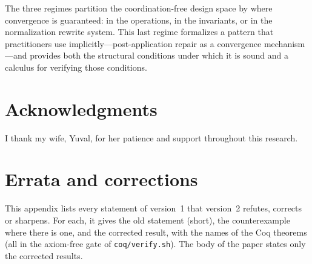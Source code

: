 \documentclass[11pt,a4paper]{article}
\theoremstyle{plain}
\theoremstyle{definition}
\theoremstyle{remark}
\begin{document}
The three regimes partition the coordination-free design space by where
convergence is guaranteed: in the operations, in the invariants, or in the
normalization rewrite system.  This last regime formalizes a pattern that
practitioners use implicitly---post-application repair as a convergence
mechanism---and provides both the structural conditions under which it is
sound and a calculus for verifying those conditions.

\section*{Acknowledgments}

I thank my wife, Yuval, for her patience and support throughout this research.

\appendix
\section{Errata and corrections}
\label{app:errata}

This appendix lists every statement of version~1 that version~2 refutes,
corrects or sharpens.  For each, it gives the old statement (short), the
counterexample where there is one, and the corrected result, with the names of
the Coq theorems (all in the axiom-free gate of \texttt{coq/verify.sh}).  The
body of the paper states only the corrected results.
\end{document}

